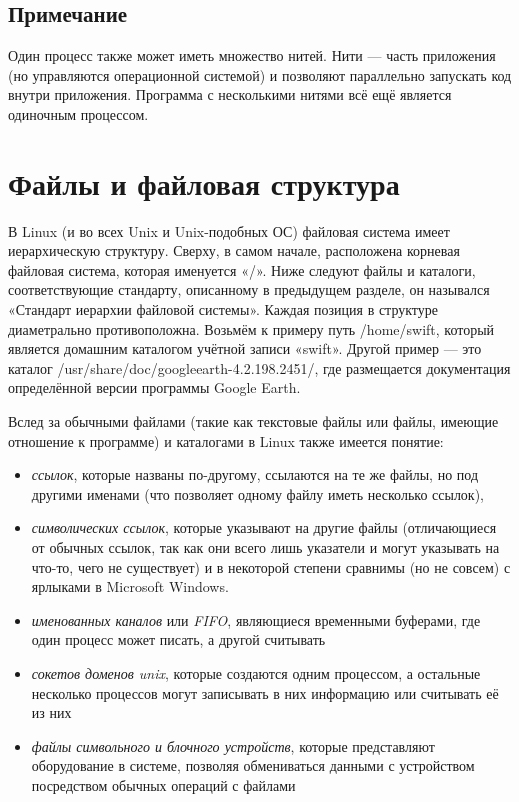 \documentclass[10pt]{book}
\begin{document}
\subsection{Примечание}

Один процесс также может иметь множество нитей. Нити — часть приложения (но управляются операционной системой) и позволяют параллельно запускать код внутри приложения. Программа с несколькими нитями всё ещё является одиночным процессом.

\section{Файлы и файловая структура}

В Linux (и во всех Unix и Unix-подобных ОС) файловая система имеет иерархическую структуру. Сверху,  в самом начале, расположена корневая файловая система, которая именуется «/». Ниже следуют файлы и каталоги, соответствующие стандарту, описанному в предыдущем разделе, он назывался «Стандарт иерархии файловой системы». Каждая позиция в структуре диаметрально противоположна. Возьмём к примеру путь /home/swift,  который является домашним каталогом учётной записи «swift». Другой пример — это каталог /usr/share/doc/googleearth-4.2.198.2451/, где размещается документация определённой версии программы\break{} Google Earth.

Вслед за обычными файлами (такие как текстовые файлы или файлы, имеющие отношение к программе) и каталогами в Linux также имеется понятие:

\begin{itemize}
	\item \emph{ссылок}, которые названы по-другому, ссылаются на те же файлы, но под другими именами (что позволяет одному файлу иметь несколько ссылок),
	\item \emph{символических ссылок}, которые указывают на другие файлы (отличающиеся от обычных ссылок, так как они всего лишь указатели и могут указывать на что-то, чего не существует) и в некоторой степени сравнимы (но не совсем) с ярлыками в Microsoft Windows.
	\item \emph{именованных каналов} или \emph{FIFO}, являющиеся временными буферами, где один процесс может писать, а другой считывать
	\item \emph{сокетов доменов unix}, которые создаются  одним процессом, а остальные нес\-колько процессов могут записывать в них информацию или считывать её из них
	\item \emph{файлы символьного и блочного устройств}, которые представляют оборудование в системе, позволяя обмениваться данными с устройством посредством обычных операций с файлами
\end{itemize}
\end{document}
